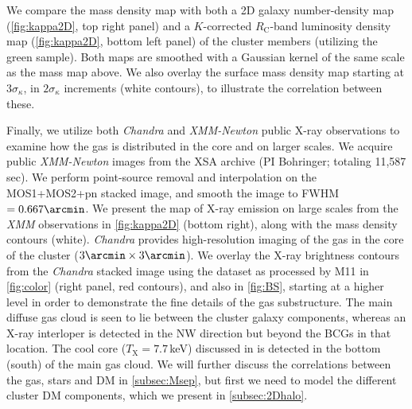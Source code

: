 \documentclass[iop,twocolumn]{emulateapj}
\def\RC{\mbox{$R_\mathrm{C}$}}
\begin{document}
We compare the mass density map with both a 2D galaxy number-density map (\autoref{fig:kappa2D}, top right panel) and a $K$-corrected $\RC$-band luminosity density map (\autoref{fig:kappa2D}, bottom left panel) of the cluster members (utilizing the green sample). Both maps are smoothed with a Gaussian kernel of the same scale as the mass map above. We also overlay the surface mass density map starting at $3\sigma_\kappa$, in $2\sigma_\kappa$ increments (white contours), to illustrate the correlation between these. 

Finally, we utilize both {\it Chandra} and {\it XMM-Newton} public X-ray observations to examine how the gas is distributed in the core and on larger scales. We acquire public {\it XMM-Newton} images from the XSA archive (PI Bohringer; totaling 11,587 sec). We perform point-source removal and interpolation on the MOS1+MOS2+pn stacked image, and smooth the image to FWHM$=0.667\arcmin$. We present the map of X-ray emission on large scales from the {\it XMM} observations in \autoref{fig:kappa2D} (bottom right), along with the mass density contours (white).
%
{\it Chandra} provides high-resolution imaging of the gas in the core of the cluster ($3\arcmin\times3\arcmin$). We overlay the X-ray brightness contours from the {\it Chandra} stacked image using the dataset as processed by M11 in \autoref{fig:color} (right panel, red contours), and also in \autoref{fig:BS}, starting at a higher level in order to demonstrate the fine details of the gas substructure. The main diffuse gas cloud is seen to lie between the cluster galaxy components, whereas an X-ray interloper is detected in the NW direction but beyond the BCGs in that location. The cool core ($T_\mathrm{X}=7.7$\,keV) discussed in \cite{Owers2011} is detected in the bottom (south) of the main gas cloud. We will further discuss the correlations between the gas, stars and DM in \autoref{subsec:Msep}, but first we need to model the different cluster DM components, which we present in \autoref{subsec:2Dhalo}.

\end{document}
